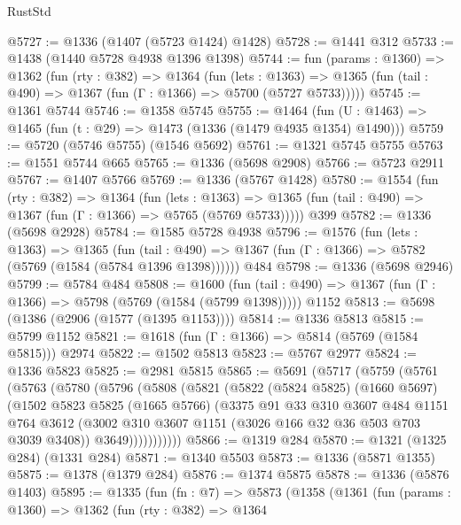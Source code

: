 \begin{lexlean}{RustStd}
\begin{coremodule}
@5727 := @1336 (@1407 (@5723 @1424) @1428)
@5728 := @1441 @312
@5733 := @1438 (@1440 @5728 @4938 @1396 @1398)
@5744 := fun (params : @1360) =>
  @1362
    (fun (rty : @382) =>
    @1364
      (fun (lets : @1363) =>
      @1365 (fun (tail : @490) => @1367 (fun (Γ : @1366) => @5700 (@5727 @5733)))))
@5745 := @1361 @5744
@5746 := @1358 @5745
@5755 := @1464 (fun (U : @1463) => @1465 (fun (t : @29) => @1473 (@1336 (@1479 @4935 @1354) @1490)))
@5759 := @5720 (@5746 @5755) (@1546 @5692)
@5761 := @1321 @5745 @5755
@5763 := @1551 @5744 @665
@5765 := @1336 (@5698 @2908)
@5766 := @5723 @2911
@5767 := @1407 @5766
@5769 := @1336 (@5767 @1428)
@5780 := @1554
    (fun (rty : @382) =>
    @1364
      (fun (lets : @1363) =>
      @1365 (fun (tail : @490) => @1367 (fun (Γ : @1366) => @5765 (@5769 @5733)))))
    @399
@5782 := @1336 (@5698 @2928)
@5784 := @1585 @5728 @4938
@5796 := @1576
    (fun (lets : @1363) =>
    @1365
      (fun (tail : @490) => @1367 (fun (Γ : @1366) => @5782 (@5769 (@1584 (@5784 @1396 @1398))))))
    @484
@5798 := @1336 (@5698 @2946)
@5799 := @5784 @484
@5808 := @1600
    (fun (tail : @490) => @1367 (fun (Γ : @1366) => @5798 (@5769 (@1584 (@5799 @1398)))))
    @1152
@5813 := @5698 (@1386 (@2906 (@1577 (@1395 @1153))))
@5814 := @1336 @5813
@5815 := @5799 @1152
@5821 := @1618 (fun (Γ : @1366) => @5814 (@5769 (@1584 @5815))) @2974
@5822 := @1502 @5813
@5823 := @5767 @2977
@5824 := @1336 @5823
@5825 := @2981 @5815
@5865 := @5691
    (@5717
      (@5759
        (@5761
          (@5763
            (@5780
              (@5796
                (@5808
                  (@5821
                    (@5822
                      (@5824 @5825)
                      (@1660 @5697)
                      (@1502
                        @5823
                        @5825
                        (@1665 @5766)
                        (@3375
                          @91
                          @33
                          @310
                          @3607
                          @484
                          @1151
                          @764
                          @3612
                          (@3002 @310 @3607 @1151 (@3026 @166 @32 @36 @503 @703 @3039 @3408))
                          @3649)))))))))))
@5866 := @1319 @284
@5870 := @1321 (@1325 @284) (@1331 @284)
@5871 := @1340 @5503
@5873 := @1336 (@5871 @1355)
@5875 := @1378 (@1379 @284)
@5876 := @1374 @5875
@5878 := @1336 (@5876 @1403)
@5895 := @1335
    (fun (fn : @7) =>
    @5873
      (@1358
        (@1361
          (fun (params : @1360) =>
          @1362
            (fun (rty : @382) =>
            @1364

\end{coremodule}
\end{lexlean}

